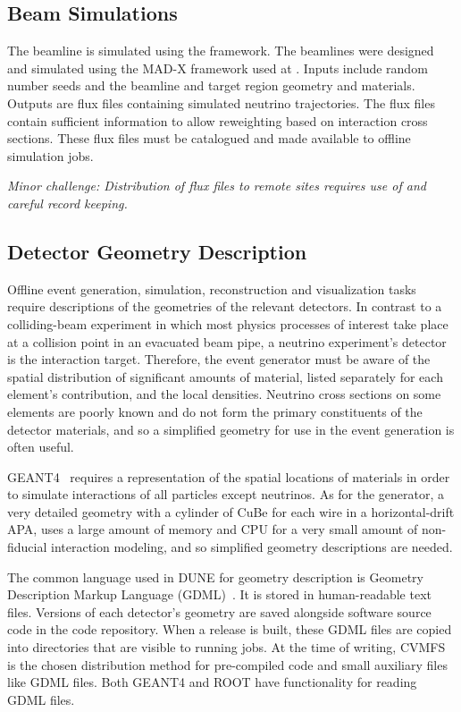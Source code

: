 \documentclass[../main-v1.tex]{subfiles}
\begin{document}
\subsection{Beam Simulations}
The  
beamline is simulated using the  framework.  The  beamlines were designed and simulated using the MAD-X framework used at \cite{PhysRevAccelBeams.20.111001}.
Inputs include random number seeds and the beamline and target region geometry and materials.  Outputs are flux files containing simulated neutrino trajectories.  The flux files contain sufficient information to allow reweighting based on interaction cross sections.  These flux files must be catalogued and made available to offline simulation jobs.

{\it Minor challenge:  Distribution of flux files to remote sites requires use of  and careful record keeping.}

\subsection{Detector Geometry Description}

Offline event generation, simulation, reconstruction and visualization tasks require descriptions of the geometries of the relevant detectors.  In contrast to a colliding-beam experiment in which most physics processes of interest take place at a collision point in an evacuated beam pipe, a neutrino experiment's detector is the interaction target.  Therefore, the event generator must be aware of the spatial distribution of significant amounts of material, listed separately for each element's contribution, and the local densities.  Neutrino cross sections on some elements are poorly known and do not form the primary constituents of the detector materials, and so a simplified geometry for use in the event generation is often useful.

GEANT4~\cite{geant4} requires a representation of the spatial locations of materials in order to simulate interactions of all particles except neutrinos.  As for the generator, a very detailed geometry with a cylinder of CuBe for each wire in a horizontal-drift APA, uses a large amount of memory and CPU for a very small amount of non-fiducial interaction modeling, and so simplified geometry descriptions are needed.

The common language used in DUNE for geometry description is Geometry Description Markup Language (GDML)~\cite{gdml}.  It is stored in human-readable text files.  Versions of each detector's geometry are saved alongside software source code in the code repository.  When a release is built, these GDML files are copied into directories that are visible to running jobs.  At the time of writing, CVMFS is the chosen distribution method for pre-compiled code and small auxiliary files like GDML files.   Both GEANT4 and ROOT have functionality for reading GDML files.
\end{document}
